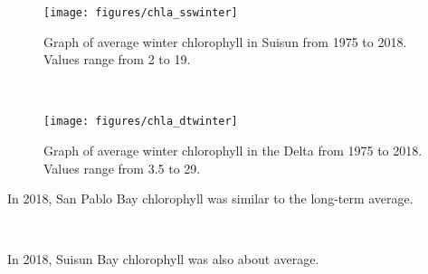 \documentclass[
]{book}
\begin{document}
\begin{panel-grid}
\begin{columns-nocenter}
\begin{column800}

\begin{expand}

\begin{figure}
\texttt{[image: figures/chla\_sswinter]} \caption{Graph of average winter chlorophyll in Suisun from 1975 to 2018. Values range from 2 to 19.}\label{fig:unnamed-chunk-159}
\end{figure}

\end{expand}

\end{column800}

\begin{column40}

~

\end{column40}

\begin{column800}

\begin{expand}

\begin{figure}
\texttt{[image: figures/chla\_dtwinter]} \caption{Graph of average winter chlorophyll in the Delta from 1975 to 2018. Values range from 3.5 to 29.}\label{fig:unnamed-chunk-160}
\end{figure}

\end{expand}

\end{column800}

\end{columns-nocenter}

\begin{columns-nocenter}

\begin{column800}

In 2018, San Pablo Bay chlorophyll was similar to the long-term average.

\end{column800}

\begin{column40}

~

\end{column40}

\begin{column800}

In 2018, Suisun Bay chlorophyll was also about average.


\end{column800}
\end{columns-nocenter}
\end{panel-grid}
\end{document}
